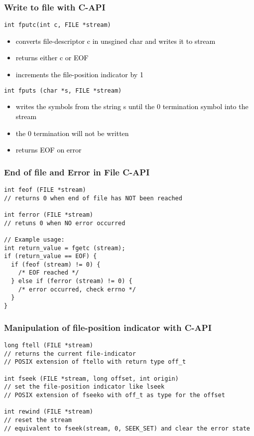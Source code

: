 \documentclass[main.tex,fontsize=8pt,paper=a4,paper=portrait,DIV=calc,]{scrartcl}
\begin{document}
\subsubsection{Write to file with C-API}
\begin{lstlisting}
int fputc(int c, FILE *stream)
\end{lstlisting}
\begin{itemize}
\item \textcolor{black}{converts file-descriptor c in unsgined char and writes it to stream}
\item \textcolor{black}{returns either c or EOF}
\item \textcolor{black}{increments the file-position indicator by 1}
\end{itemize} 
\begin{lstlisting}
int fputs (char *s, FILE *stream)
\end{lstlisting}
\begin{itemize}
\item \textcolor{black}{writes the symbols from the string s until the 0 termination symbol into the stream}
\item \textcolor{black}{the 0 termination will not be written}
\item \textcolor{black}{returns EOF on error}
\end{itemize} 

\subsubsection{End of file and Error in File C-API}
\begin{lstlisting}
int feof (FILE *stream)
// returns 0 when end of file has NOT been reached

int ferror (FILE *stream)
// retuns 0 when NO error occurred

// Example usage:
int return_value = fgetc (stream);
if (return_value == EOF) {
  if (feof (stream) != 0) {
    /* EOF reached */
  } else if (ferror (stream) != 0) {
    /* error occurred, check errno */
  }
}
\end{lstlisting}

\subsubsection{Manipulation of file-position indicator with C-API}
\begin{lstlisting}
long ftell (FILE *stream)
// returns the current file-indicator
// POSIX extension of ftello with return type off_t

int fseek (FILE *stream, long offset, int origin)
// set the file-position indicator like lseek
// POSIX extension of fseeko with off_t as type for the offset

int rewind (FILE *stream)
// reset the stream
// equivalent to fseek(stream, 0, SEEK_SET) and clear the error state
\end{lstlisting}
\end{document}
